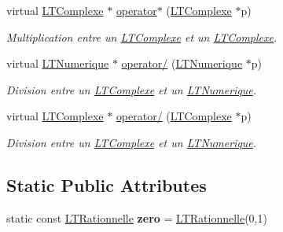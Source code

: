 \begin{DoxyCompactItemize}
virtual \hyperlink{class_l_t_complexe}{L\+T\+Complexe} $\ast$ \hyperlink{class_l_t_rationnelle_a5243f9ce9fd277473bd95f873b32c1e5}{operator$\ast$} (\hyperlink{class_l_t_complexe}{L\+T\+Complexe} $\ast$p)
\begin{DoxyCompactList}\small\item\em Multiplication entre un \hyperlink{class_l_t_complexe}{L\+T\+Complexe} et un \hyperlink{class_l_t_complexe}{L\+T\+Complexe}. \end{DoxyCompactList}\item 
virtual \hyperlink{class_l_t_numerique}{L\+T\+Numerique} $\ast$ \hyperlink{class_l_t_rationnelle_a9f82305c64896be366084ee6941933b1}{operator/} (\hyperlink{class_l_t_numerique}{L\+T\+Numerique} $\ast$p)
\begin{DoxyCompactList}\small\item\em Division entre un \hyperlink{class_l_t_complexe}{L\+T\+Complexe} et un \hyperlink{class_l_t_numerique}{L\+T\+Numerique}. \end{DoxyCompactList}\item 
virtual \hyperlink{class_l_t_complexe}{L\+T\+Complexe} $\ast$ \hyperlink{class_l_t_rationnelle_a6a44ee4834907f1e97008a0f7e3f33a1}{operator/} (\hyperlink{class_l_t_complexe}{L\+T\+Complexe} $\ast$p)
\begin{DoxyCompactList}\small\item\em Division entre un \hyperlink{class_l_t_complexe}{L\+T\+Complexe} et un \hyperlink{class_l_t_numerique}{L\+T\+Numerique}. \end{DoxyCompactList}\end{DoxyCompactItemize}
\subsection*{Static Public Attributes}
\begin{DoxyCompactItemize}
\item 
static const \hyperlink{class_l_t_rationnelle}{L\+T\+Rationnelle} {\bfseries zero} = \hyperlink{class_l_t_rationnelle}{L\+T\+Rationnelle}(0,1)\hypertarget{class_l_t_rationnelle_a9189dabc14c138f122c298a9f7919547}{}\label{class_l_t_rationnelle_a9189dabc14c138f122c298a9f7919547}

\end{DoxyCompactItemize}
